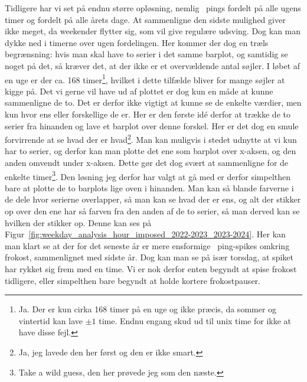 \begin{article}
Tidligere har vi set på endnu større opløsning, nemlig \coffee\ pings fordelt på alle ugens timer og fordelt på alle årets dage. At sammenligne den sidste mulighed giver ikke meget, da weekender flytter sig, som vil give regulære udsving. Dog kan man dykke ned i timerne over ugen fordelingen.
Her kommer der dog en træls begrænsning: hvis man skal have to serier i det samme barplot, og samtidig se noget på det, så kræver det, at der ikke er et overvældende antal søjler. I løbet af en uge er der ca. 168 timer\footnote{Ja. Der er kun cirka 168 timer på en uge og ikke præcis, da sommer og vintertid kan lave $\pm 1$ time. Endnu engang skud ud til unix time for ikke at have disse fejl.}, hvilket i dette tilfælde bliver for mange søjler at kigge på.
Det vi gerne vil have ud af plottet er dog kun en måde at kunne sammenligne de to. Det er derfor ikke vigtigt at kunne se de enkelte værdier, men kun hvor ens eller forskellige de er. Her er den første idé derfor at trække de to serier fra hinanden og lave et barplot over denne forskel. Her er det dog en smule forvirrende at se hvad der er hvad\footnote{Ja, jeg lavede den her først og den er ikke smart.}. Man kan muligvis i stedet udnytte at vi kun har to serier, og derfor kan man plotte det ene som barplot over x-aksen, og den anden omvendt under x-aksen. Dette gør det dog svært at sammenligne for de enkelte timer\footnote{Take a wild guess, den her prøvede jeg som den næste.}. Den løsning jeg derfor har valgt at gå med er derfor simpelthen bare at plotte de to barplots lige oven i hinanden. Man kan så blande farverne i de dele hvor serierne overlapper, så man kan se hvad der er ens, og alt der stikker op over den ene har så farven fra den anden af de to serier, så man derved kan se hvilken der stikker op. Denne kan ses på Figur~\ref{fig:weekday_analysis_hour_imposed_2022-2023_2023-2024}.
Her kan man klart se at der for det seneste år er mere ensformige \coffee\ ping-spikes omkring frokost, sammenlignet med sidste år. Dog kan man se på især torsdag, at spiket har rykket sig frem med en time. Vi er nok derfor enten begyndt at spise frokost tidligere, eller simpelthen bare begyndt at holde kortere frokostpauser.

\begin{figure*}[t!]
	\centering
	\resizebox{2\columnwidth}{!}{}
	\vspace{-10pt}
	\caption{\protect\coffee\ pings fordelt på klokkeslet og ugedage i mørk for 2022-2023 og i lys for 2023-2024 perioden, med den mellemgrå farve hvor disse overlapper.}
	\label{fig:weekday_analysis_hour_imposed_2022-2023_2023-2024}
\end{figure*}


\end{article}
